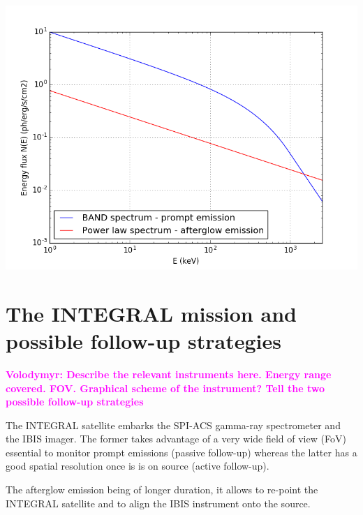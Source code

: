 \documentclass[a0,portrait]{a0poster}
\newcommand{\ECM}[1] {\textbf{\textcolor{magenta}{#1}}}
\begin{document}
\begin{multicols}{2}
\begin{center}\vspace{.5cm}
    \includegraphics[width=20cm]{figures/spectra.png}
    \label{spectra}
\end{center}

\section*{The INTEGRAL mission and possible follow-up strategies}

\ECM{Volodymyr: Describe the relevant instruments here. Energy range covered. FOV. 
Graphical scheme of the instrument? Tell the two possible follow-up strategies}

The INTEGRAL satellite embarks the SPI-ACS gamma-ray spectrometer and the IBIS
imager. The former takes advantage of a very wide field of view (FoV) essential
to monitor prompt emissions (passive follow-up) whereas the latter has a good
spatial resolution once is is on source (active follow-up).

The afterglow emission being of longer duration, it allows to re-point the
INTEGRAL satellite and to align the IBIS instrument onto the source.



\end{multicols}
\end{document}
